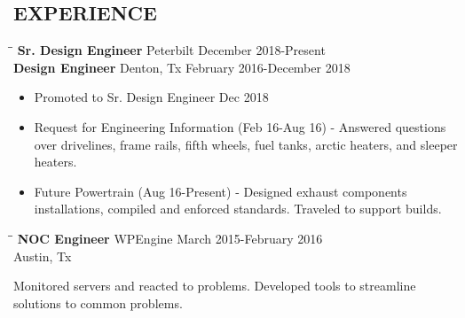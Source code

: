\documentclass{res}
\begin{document}
\begin{resume}
\section{EXPERIENCE}
   \vspace{-0.1in}	
   \begin{tabbing}
   \hspace{2.5in}\= \hspace{2.6in}\= \kill %
   {\bf Sr. Design Engineer} \>Peterbilt     \>December 2018-Present\\
   {\bf Design Engineer} \>Denton, Tx     \>February 2016-December 2018
   \end{tabbing}\vspace{-10pt}      %
    \begin{itemize}
        \item Promoted to Sr. Design Engineer Dec 2018
        \item Request for Engineering Information (Feb 16-Aug 16) - Answered questions over drivelines, frame rails, fifth wheels, fuel tanks, arctic heaters, and sleeper heaters.\\ \vspace{-15pt}
        \item Future Powertrain (Aug 16-Present) - Designed exhaust components installations, compiled and enforced standards. Traveled to support builds. %
    \end{itemize}

   \begin{tabbing}
   \hspace{2.5in}\= \hspace{2.6in}\= \kill %
   {\bf NOC Engineer} \>WPEngine     \>March 2015-February 2016\\
    \>Austin, Tx
   \end{tabbing}\vspace{-20pt}      %
   Monitored servers and reacted to problems. Developed tools to streamline solutions to common problems. 


\end{resume}
\end{document}
